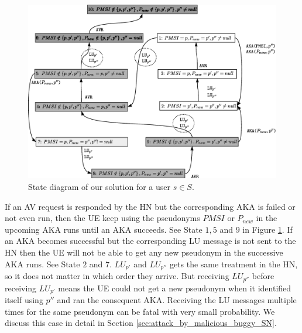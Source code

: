 \documentclass{llncs} %
\begin{document}
\begin{figure}[!tbp]
  \centering
    \includegraphics[width=.95\textwidth]{solution_diagram.eps}
 \caption{State diagram of our solution for a user $s \in S$.}
  \label{fig:solution_diagram}
\end{figure}

If an AV request is responded by the HN but the corresponding AKA is failed or not even run, then the UE keep using the pseudonyms $PMSI$ or $P_{new}$ in the upcoming AKA runs until an AKA succeeds. See State $1,5$ and $9$ in Figure \ref{fig:solution_diagram}. If an AKA becomes successful but the corresponding LU message is not sent to the HN then the UE will not be able to get any new pseudonym in the successive AKA runs. See State $2$ and $7$. $LU_{p'}$ and $LU_{p''}$ gets the same treatment in the HN, so it does not matter in which order they arrive. But receiving $LU_{p''}$ before receiving $LU_{p'}$ means the UE could not get a new pseudonym when it identified itself using $p''$ and ran the consequent AKA. Receiving the LU messages multiple times for the same pseudonym can be fatal with very small probability. We discuss this case in detail in Section \ref{sec:attack_by_malicious_buggy_SN}. 
\end{document}
